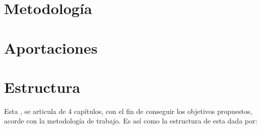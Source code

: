%
%

\section{Metodología}


\section{Aportaciones}

\section{Estructura}

Esta \nombreDoc, se  articula de 4 capítulos, con el fin de conseguir los objetivos propuestos, acorde con la metodología de trabajo. Es así como la estructura de \nombreDoc esta dada por:


